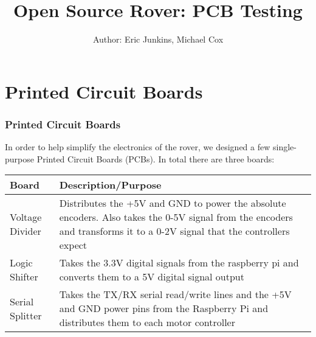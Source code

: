 \documentclass[12pt]{article}
\begin{document}
\title{Open Source Rover: PCB Testing}
\author{Author: Eric Junkins, Michael Cox}

\makeatletter         
\def\@maketitle{
\begin{center}	
	\makebox[\textwidth][c]{ \texttt{[image: "Pictures/pcb title".png]}}
	{\Huge \bfseries \sffamily \@title }\\[3ex] 
	{\Large \sffamily \@author}\\[3ex] 
	\texttt{[image: "Pictures/Electronics/JPL logo".png]}
\end{center}}
\makeatother

\maketitle


\newpage


\tableofcontents

\newpage




\section{Printed Circuit Boards}

\subsubsection{Printed Circuit Boards}
In order to help simplify the electronics of the rover, we designed a few single-purpose Printed Circuit Boards (PCBs). In total there are three boards:
\bigskip

\begin{tabular}[2]{| p{5cm} | p{10cm} | }
	\hline
	\textbf{Board} & \textbf{Description/Purpose} \\ \hline
	Voltage Divider & Distributes the +5V and GND to power the absolute encoders. Also takes the 0-5V signal from the encoders and transforms it to a 0-2V signal that the controllers expect \\ \hline
	Logic Shifter & Takes the 3.3V digital signals from the raspberry pi and converts them to a 5V digital signal output \\ \hline
	Serial Splitter & Takes the TX/RX serial read/write lines and the +5V and GND power pins from the Raspberry Pi and distributes them to each motor controller \\ \hline
\end{tabular}
\bigskip
\end{document}

